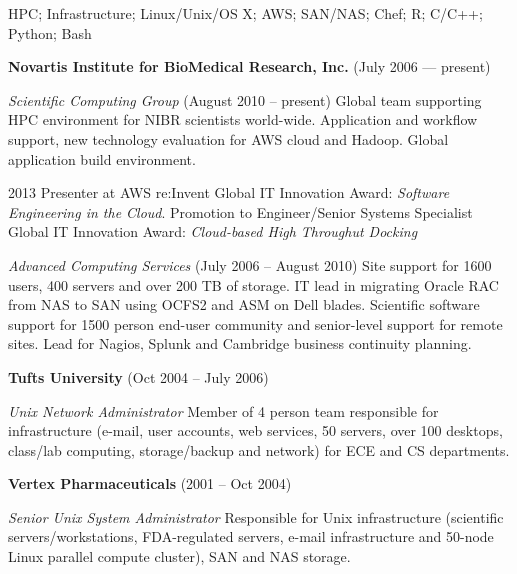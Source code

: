 \documentclass[11pt,article,oneside]{memoir}
\begin{document}
\medskip

\reversemarginpar

\bigskip


\ind HPC; Infrastructure; Linux/Unix/OS X; AWS; SAN/NAS; Chef; R; C/C++; Python; Bash

\bigskip

{}

\ind \textbf{Novartis Institute for BioMedical Research, Inc.} (July 2006 --- present)

\noindent\textit{Scientific Computing Group} (August 2010 -- present)
Global team supporting HPC environment for NIBR scientists
world-wide. Application and workflow support, new technology
evaluation for AWS cloud and Hadoop. Global application build
environment.

\ind \hspace{0.35in} \footnotesize 2013 Presenter at AWS
re:Invent Global IT Innovation Award:
\textit{Software Engineering in the Cloud}. Promotion to
Engineer/Senior Systems Specialist Global IT
Innovation Award: \textit{Cloud-based High Throughut Docking}
\normalsize \vspace{0.05in}

\noindent\textit{Advanced Computing Services} (July 2006 -- August
2010) Site support for 1600 users, 400 servers and over 200 TB of
storage. IT lead in migrating Oracle RAC from NAS to SAN using OCFS2
and ASM on Dell blades. Scientific software support for 1500 person
end-user community and senior-level support for remote sites. Lead for
Nagios, Splunk and Cambridge business continuity planning.

\ind\textbf{Tufts University} (Oct 2004 -- July 2006)

\noindent\textit{Unix Network Administrator} Member of 4 person team
responsible for infrastructure (e-mail, user accounts, web services,
50 servers, over 100 desktops, class/lab computing, storage/backup and
network) for ECE and CS departments.

\ind \textbf{Vertex Pharmaceuticals} (2001 -- Oct 2004)

\noindent\textit{Senior Unix System Administrator} Responsible for
Unix infrastructure (scientific servers/workstations, FDA-regulated
servers, e-mail infrastructure and 50-node Linux parallel compute
cluster), SAN and NAS storage.
\end{document}
